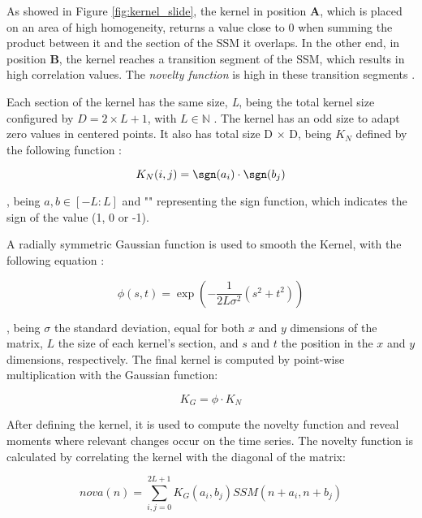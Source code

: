 As showed in Figure \ref{fig:kernel_slide}, the kernel in position \textbf{A}, which is placed on an area of high homogeneity, returns a value close to $0$ when summing the product between it and the section of the \gls{SSM} it overlaps. In the other end, in position \textbf{B}, the kernel reaches a transition segment of the \gls{SSM}, which results in high correlation values. The \textit{novelty function} is high in these transition segments \cite{Dannenberg2008, Mueller15_FMP_SPRINGER, MuellerZ19_FMP_ISMIR}.
\par
Each section of the kernel has the same size, \textit{L}, being the total kernel size configured by $D = 2 \times L + 1$, with $L \in \mathbb{N}$ . The kernel has an odd size to adapt zero values in centered points. It also has total size D $\times$ D, being $K_{N}$ defined by the following function \cite{Mueller15_FMP_SPRINGER, MuellerZ19_FMP_ISMIR}:

\begin{equation}
        K_N(i,j)  = \sgn(a_i) \cdot \sgn(b_j)
\end{equation}

, being $a, b \in [-L:L]$ and "\sgn" representing the sign function, which indicates the sign of the value (1, 0 or -1).
\par
A radially symmetric Gaussian function is used to smooth the Kernel, with the following equation \cite{Mueller15_FMP_SPRINGER, MuellerZ19_FMP_ISMIR}:

\begin{equation}
    \phi(s,t) = \exp(-\frac{1}{2L\sigma^2}(s^2 + t^2))
\end{equation}

, being $\sigma$ the standard deviation, equal for both $x$ and $y$ dimensions of the matrix, $L$ the size of each kernel's section, and $s$ and $t$ the position in the $x$ and $y$ dimensions, respectively. The final kernel is computed by point-wise multiplication with the Gaussian function:

\begin{equation}
    K_{G} = \phi \cdot K_{N}    
\end{equation}

After defining the kernel, it is used to compute the novelty function and reveal moments where relevant changes occur on the time series. The novelty function is calculated by correlating the kernel with the diagonal of the matrix:

\begin{equation}
    nova(n) = \sum^{2L+1}_{i,j=0} K_{G}(a_i,b_j)SSM(n+a_i, n+b_j)
\end{equation}

